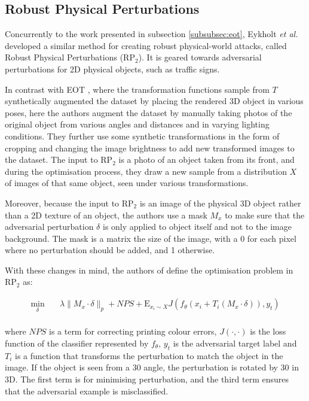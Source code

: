 \subsection{Robust Physical Perturbations}

Concurrently to the work presented in subsection \ref{subsubsec:eot}, Eykholt \textit{et al.} \cite{evtimov_road_signs} developed a similar method for creating robust physical-world attacks, called Robust Physical Perturbations ($\textrm{RP}_2$). It is geared towards adversarial perturbations for 2D physical objects, such as traffic signs. 

In contrast with EOT \cite{athalye}, where the transformation functions sample from $T$ synthetically augmented the dataset by placing the rendered 3D object in various poses, here the authors augment the dataset by manually taking photos of the original object from various angles and distances and in varying lighting conditions. They further use some synthetic transformations in the form of cropping and changing the image brightness to add new transformed images to the dataset. The input to $\textrm{RP}_2$ is a photo of an object taken from its front, and during the optimisation process, they draw a new sample from a distribution $X$ of images of that same object, seen under various transformations.

Moreover, because the input to $\textrm{RP}_2$ is an image of the physical 3D object rather than a 2D texture of an object, the authors use a mask $M_x$ to make sure that the adversarial perturbation $\delta$ is only applied to object itself and not to the image background. The mask is a matrix the size of the image, with a 0 for each pixel where no perturbation should be added, and 1 otherwise. 

With these changes in mind, the authors of \cite{evtimov_road_signs} define the optimisation problem in $\textrm{RP}_2$ as:

\begin{equation}
\begin{aligned}
\min_{\delta} \quad & \lambda\|M_x \cdot \delta\|_p + NPS + \mathrm{E}_{x_i\sim X}J(f_\theta(x_i + T_i(M_x \cdot \delta)), y_t)\\
\label{eq:rp2}
\end{aligned}
\end{equation}

\noindent where $NPS$ is a term for correcting printing colour errors, $J(\cdot, \cdot)$ is the loss function of the classifier represented by $f_\theta$, $y_t$ is the adversarial target label and $T_i$ is a function that transforms the perturbation to match the object in the image. If the object is seen from a 30\degree{} angle, the perturbation is rotated by 30\degree{} in 3D. The first term is for minimising perturbation, and the third term ensures that the adversarial example is misclassified.


